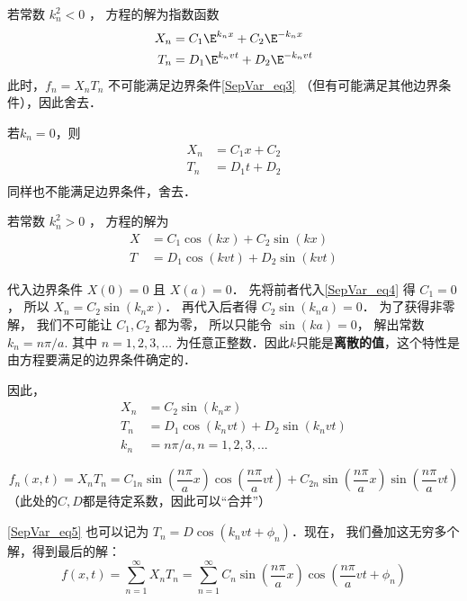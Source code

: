若常数 $k_n^2 < 0$ ， 方程的解为指数函数
\begin{align}
X_n &= C_1 \E^{k_nx} + C_2 \E^{-k_nx}\\
T_n &= D_1 \E^{k_nvt} + D_2 \E^{-k_nvt}
\end{align}
此时，$f_n = X_nT_n$ 不可能满足边界条件\autoref{SepVar_eq3}  （但有可能满足其他边界条件），因此舍去．

若$k_n=0$，则
\begin{align}
X_n &= C_1x+C_2\\
T_n &= D_1t+D_2\\
\end{align}
同样也不能满足边界条件，舍去．

若常数 $k_n^2 > 0$ ， 方程的解为
\begin{align}\label{SepVar_eq4}
X &= C_1 \cos(kx) + C_2 \sin(kx)\\
T &= D_1 \cos(kvt) + D_2 \sin(kvt)
\end{align}

代入边界条件 $X(0) = 0$ 且 $X(a) = 0$． 先将前者代入\autoref{SepVar_eq4} 得 $C_1 = 0$， 所以 $X_n = C_2\sin(k_nx)$． 再代入后者得 $C_2\sin(k_na) = 0$． 为了获得非零解， 我们不可能让 $C_1, C_2$ 都为零， 所以只能令 $\sin(ka) = 0$， 解出常数 $k_n = n\pi/a$. 其中 $n=1,2,3,...$ 为任意正整数．因此$k$只能是\textbf{离散的值}，这个特性是由方程要满足的边界条件确定的．

因此，
\begin{align}
\label{SepVar_eq5}X_n &= C_2 \sin(k_nx)\\
T_n &= D_1 \cos(k_nvt) + D_2 \sin(k_nvt)\\
k_n & = n\pi/a, n=1,2,3,...
\end{align}

\begin{equation}
f_n(x, t) = X_n T_n = C_{1n} \sin(\frac{n\pi}{a}x)\cos(\frac{n\pi}{a} vt) + C_{2n}\sin(\frac{n\pi}{a}x)\sin(\frac{n\pi}{a}vt)
\end{equation}
（此处的$C, D$都是待定系数，因此可以“合并”）

\autoref{SepVar_eq5} 也可以记为 $T_n=D\cos(k_nvt+\phi_n)$．现在， 我们叠加这无穷多个解，得到最后的解：
\begin{equation}
f(x, t) = \sum_{n=1}^\infty X_nT_n = \sum_{n=1}^\infty C_n\sin(\frac{n\pi}{a}x)\cos(\frac{n\pi}{a}vt + \phi_n)
\end{equation}
